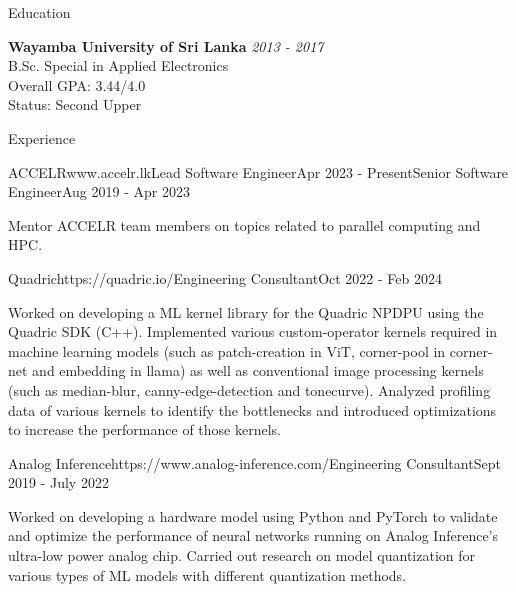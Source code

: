 \documentclass[
	11pt, %
]{./../assets/resume} %
\begin{document}
\begin{rSection}{Education}

	\textbf{Wayamba University of Sri Lanka} \hfill \textit{2013 - 2017} \\ 
	B.Sc. Special in Applied Electronics \\
	Overall GPA: 3.44/4.0 \\
	Status: Second Upper
	
\end{rSection}


\begin{rSection}{Experience}

	\begin{rSubsectionM}{ACCELR}{www.accelr.lk}{Lead Software Engineer}{Apr 2023 - Present}{Senior Software Engineer}{Aug 2019 - Apr 2023}{}{}
        \item Mentor ACCELR team members on topics related to parallel computing and HPC.
	\end{rSubsectionM}

	\begin{rSubsectionX}{Quadric}{https://quadric.io/}{Engineering Consultant}{Oct 2022 - Feb 2024}
		\item Worked on developing a ML kernel library for the Quadric NPDPU using the Quadric SDK (C++). Implemented various custom-operator kernels required in machine learning models (such as patch-creation in ViT, corner-pool in corner-net and embedding in llama) as well as conventional image processing kernels (such as median-blur, canny-edge-detection and tonecurve). Analyzed profiling data of various kernels to identify the bottlenecks and introduced optimizations to increase the performance of those kernels.
	\end{rSubsectionX}

	\begin{rSubsectionX}{Analog Inference}{https://www.analog-inference.com/}{Engineering Consultant}{Sept 2019 - July 2022}
		\item Worked on developing a hardware model using Python and PyTorch to validate and optimize the performance of neural networks running on Analog Inference’s ultra-low power analog chip. Carried out research on model quantization for various types of ML models with different quantization methods.
	\end{rSubsectionX}


\end{rSection}
\end{document}
